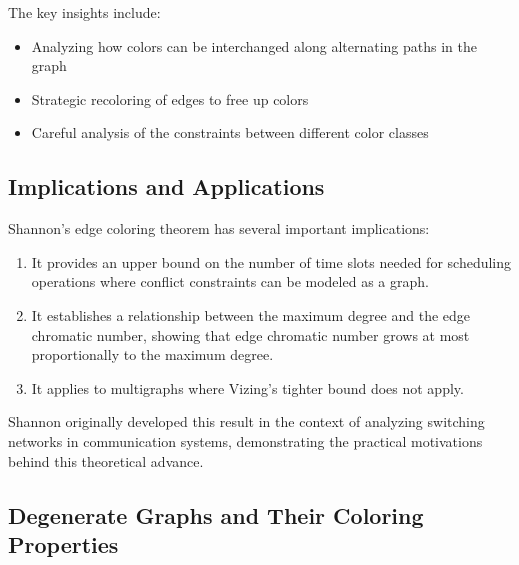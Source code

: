 \documentclass{article}
\theoremstyle{definition}
\begin{document}
The key insights include:
\begin{itemize}
    \item Analyzing how colors can be interchanged along alternating paths in the graph
    \item Strategic recoloring of edges to free up colors
    \item Careful analysis of the constraints between different color classes
\end{itemize}

\subsection*{Implications and Applications}

Shannon's edge coloring theorem has several important implications:

\begin{enumerate}
    \item It provides an upper bound on the number of time slots needed for scheduling operations where conflict constraints can be modeled as a graph.
    \item It establishes a relationship between the maximum degree and the edge chromatic number, showing that edge chromatic number grows at most proportionally to the maximum degree.
    \item It applies to multigraphs where Vizing's tighter bound does not apply.
\end{enumerate}

Shannon originally developed this result in the context of analyzing switching networks in communication systems, demonstrating the practical motivations behind this theoretical advance.

\subsection{Degenerate Graphs and Their Coloring Properties}
\end{document}
